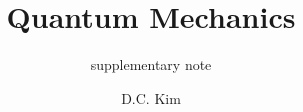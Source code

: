 \documentclass[graybox,envcountchap,sectrefs]{style/svmono}
\begin{document}
\author{D.C. Kim}
\title{Quantum Mechanics}
\subtitle{supplementary note}
\maketitle

\frontmatter%

%
%
%
%

\tableofcontents




\mainmatter%
%


%


\backmatter%


\printindex

\end{document}
